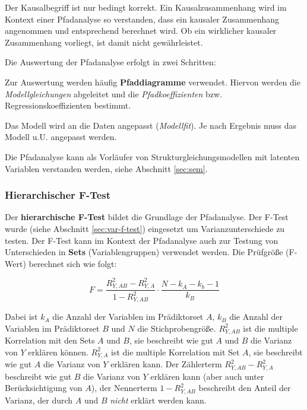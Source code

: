 \documentclass{article}
\numberwithin{equation}{section}
\begin{document}
Der Kausalbegriff ist nur bedingt korrekt. Ein Kausalzusammenhang wird im Kontext einer Pfadanalyse so verstanden, dass ein kausaler Zusammenhang angenommen und entsprechend berechnet wird. Ob ein wirklicher kausaler Zusammenhang vorliegt, ist damit nicht gewährleistet.

Die Auswertung der Pfadanalyse erfolgt in zwei Schritten:

\begin{compactenum}
\item Zur Auswertung werden häufig \textbf{Pfaddiagramme} verwendet. Hiervon werden die \emph{Modellgleichungen} abgeleitet und die \emph{Pfadkoeffizienten} bzw. Regressionskoeffizienten bestimmt.
\item Das Modell wird an die Daten angepasst (\emph{Modellfit}). Je nach Ergebnis muss das Modell u.U. angepasst werden.
\end{compactenum}

Die Pfadanalyse kann als Vorläufer von Strukturgleichungsmodellen mit latenten Variablen verstanden werden, siehe Abschnitt \ref{sec:sem}. 

\subsubsection{Hierarchischer F-Test}

Der \textbf{hierarchische F-Test} bildet die Grundlage der Pfadanalyse. Der F-Test wurde (siehe Abschnitt \ref{sec:var-f-test}) eingesetzt um Varianzunterschiede zu testen. Der F-Test kann im Kontext der Pfadanalyse auch zur Testung von Unterschieden in \textbf{Sets} (Variablengruppen) verwendet werden. Die Prüfgröße (F-Wert) berechnet sich wie folgt:

\begin{equation}
F = \frac{R^2_{Y,AB} - R^2_{Y,A}}{1 - R^2_{Y,AB}} \cdot \frac{N-k_A-k_b-1}{k_B}
\end{equation}

Dabei ist $k_A$ die Anzahl der Variablen im Prädiktorset $A$, $k_B$ die Anzahl der Variablen im Prädiktorset $B$ und $N$ die Stichprobengröße. $R^2_{Y,AB}$ ist die multiple Korrelation mit den Sets $A$ und $B$, sie beschreibt wie gut $A$ und $B$ die Varianz von $Y$ erklären können. $R^2_{Y,A}$ ist die multiple Korrelation mit Set $A$, sie beschreibt wie gut $A$ die Varianz von $Y$ erklären kann. Der Zählerterm ${R^2_{Y,AB} - R^2_{Y,A}}$ beschreibt wie gut $B$ die Varianz von $Y$ erklären kann (aber auch unter Berücksichtigung von $A$), der Nennerterm ${1 - R^2_{Y,AB}}$ beschreibt den Anteil der Varianz, der durch $A$ und $B$ \emph{nicht} erklärt werden kann.
\end{document}
